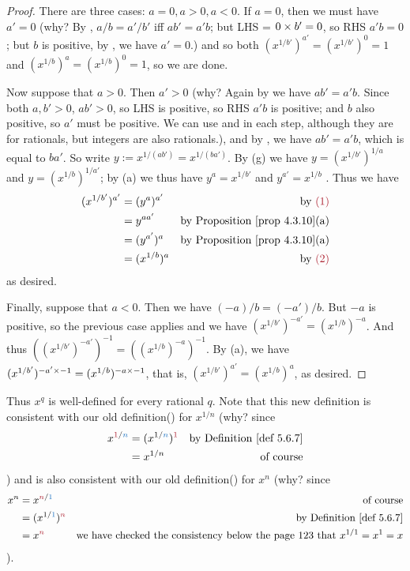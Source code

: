 \begin{proof}
There are three cases: \(a = 0, a > 0, a < 0\).
If \(a = 0\), then we must have \(a' = 0\)
(why? By , \(a/b = a'/b'\) iff \(ab' = a'b\); but LHS = \(0 \times b' = 0\), so RHS \(a'b = 0\); but \(b\) is positive, by , we have \(a' = 0\).)
and so both \((x^{1/b'})^{a'} = (x^{1/b'})^0 = 1\) and \((x^{1/b})^a = (x^{1/b})^0 = 1\), so we are done.

Now suppose that \(a > 0\).
Then \(a' > 0\)
(why? Again by  we have \(ab' = a'b\). Since both \(a, b' > 0\), \(ab' > 0\), so LHS is positive, so RHS \(a'b\) is positive;
and \(b\) also positive, so \(a'\) must be positive.
We can use  and  in each step, although they are for rationals, but integers are also rationals.),
and by , we have \(ab' = a'b\), which is equal to \(ba'\).
So write \(y := x^{1/(ab')} = x^{1/(ba')}\).
By (g) we have \(y = (x^{1/b'})^{1/a}\) and \(y = (x^{1/b})^{1/a'}\);
by (a) we thus have \(y^a = x^{1/b'}\)  and \(y^{a'} = x^{1/b}\) .
Thus we have
\begin{align*}
    (x^{1/b'})^{a'} & = (y^a)^{a'} & \text{by \MAROON{(1)}} \\
                    & = y^{aa'} & \text{by \PROP{4.3.10}(a)} \\
                    & = (y^{a'})^a & \text{by \PROP{4.3.10}(a)} \\
                    & = (x^{1/b})^a & \text{by \MAROON{(2)}}
\end{align*}
as desired.

Finally, suppose that \(a < 0\). Then we have \((-a)/b = (-a')/b\).
But \(-a\) is positive, so the previous case applies and we have \((x^{1/b'})^{-a'} = (x^{1/b})^{-a}\).
And thus \(((x^{1/b'})^{-a'})^{-1} = ((x^{1/b})^{-a})^{-1}\).
By (a), we have \((x^{1/b'})^{-a' \times -1} = (x^{1/b})^{-a \times -1}\), that is, \((x^{1/b'})^{a'} = (x^{1/b})^{a}\), as desired.
\end{proof}

Thus \(x^q\) is well-defined for every rational \(q\).
Note that this new definition is consistent with our old definition() for \(x^{1/n}\)
(why? since
\begin{align*}
    x^{\MAROON{1}/\BLUE{n}} & = (x^{1/\BLUE{n}})^{\MAROON{1}} & \text{by \DEF{5.6.7}} \\
                            & = x^{1/n} & \text{of course}
\end{align*}
)
and is also consistent with our old definition() for \(x^n\)
(why? since
\begin{align*}
    x^n & = x^{\MAROON{n}/\BLUE{1}} & \text{of course} \\
        & = (x^{1/\BLUE{1}})^{\MAROON{n}} & \text{by \DEF{5.6.7}} \\
        & = x^{\MAROON{n}} & \text{we have checked the consistency below the page \(123\) that \(x^{1/1} = x^1 = x\)}
\end{align*}
).

